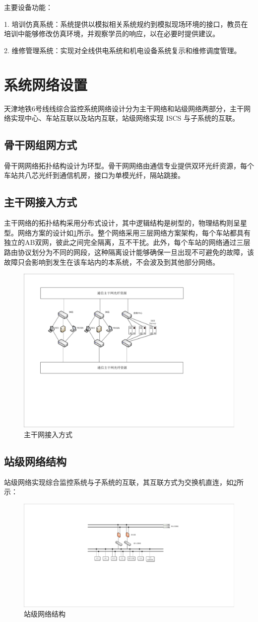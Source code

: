 主要设备功能：

1. 培训仿真系统：系统提供以模拟相关系统规约到模拟现场环境的接口，教员在培训中能够修改仿真环境，并观察学员的响应，以在必要时提供建议。

2. 维修管理系统：实现对全线供电系统和机电设备系统复示和维修调度管理。

\section{系统网络设置}
天津地铁6号线线综合监控系统网络设计分为主干网络和站级网络两部分，主干网络实现中心、车站互联以及站内互联，站级网络实现 ISCS 与子系统的互联。
\subsection{骨干网组网方式}
骨干网网络拓扑结构设计为环型。骨干网网络由通信专业提供双环光纤资源，每个车站共八芯光纤到通信机房，接口为单模光纤，隔站跳接。



\subsection{主干网接入方式}
主干网络的拓扑结构采用分布式设计，其中逻辑结构是树型的，物理结构则呈星型。网络方案的设计如\ref{fig:主干网接入方式}所示。整个网络采用三层网络方案架构，每个车站都具有独立的AB双网，彼此之间完全隔离，互不干扰。此外，每个车站的网络通过三层路由协议划分为不同的网段，这种隔离设计能够确保一旦出现不可避免的故障，该故障只会影响到发生在该车站内的本系统，不会波及到其他部分网络。
\begin{figure}[h]
	\centering
	\includegraphics[width=0.5\linewidth]{figures/主干网接入方式}
	\caption{主干网接入方式}
	\label{fig:主干网接入方式}
\end{figure}

\subsection{站级网络结构}
站级网络实现综合监控系统与子系统的互联，其互联方式为交换机直连，如\ref{fig:站级网络结构}所示：
\begin{figure}[h]
	\centering
	\includegraphics[width=0.5\linewidth]{figures/站级网络结构}
	\caption{站级网络结构}
	\label{fig:站级网络结构}
\end{figure}

